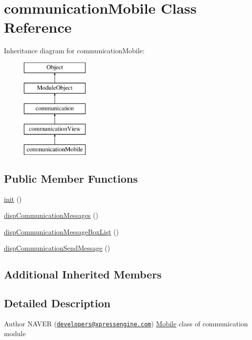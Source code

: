 \hypertarget{classcommunicationMobile}{\section{communication\+Mobile Class Reference}
\label{classcommunicationMobile}
}
Inheritance diagram for communication\+Mobile\+:\begin{figure}[H]
\begin{center}
\leavevmode
\includegraphics[height=5.000000cm]{classcommunicationMobile}
\end{center}
\end{figure}
\subsection*{Public Member Functions}
\begin{DoxyCompactItemize}
\item 
\hyperlink{classcommunicationMobile_a3fc9dd0a130e004c1fb5895ac6d4c920}{init} ()
\item 
\hyperlink{classcommunicationMobile_a1ff627f6e2111856cc297c2291dca2c7}{disp\+Communication\+Messages} ()
\item 
\hyperlink{classcommunicationMobile_a0f5fde87f62229177aa693fbc51c99d2}{disp\+Communication\+Message\+Box\+List} ()
\item 
\hyperlink{classcommunicationMobile_adb243fe0a373f12d98d472a895e41d7a}{disp\+Communication\+Send\+Message} ()
\end{DoxyCompactItemize}
\subsection*{Additional Inherited Members}


\subsection{Detailed Description}
\begin{DoxyAuthor}{Author}
N\+A\+V\+E\+R (\href{mailto:developers@xpressengine.com}{\tt developers@xpressengine.\+com}) \hyperlink{classMobile}{Mobile} class of communication module 
\end{DoxyAuthor}


